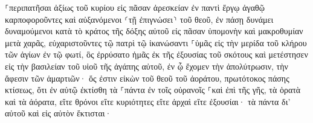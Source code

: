 \documentclass{openreader}
\begin{document}
⸀περιπατῆσαι ἀξίως τοῦ κυρίου εἰς πᾶσαν ἀρεσκείαν ἐν παντὶ ἔργῳ ἀγαθῷ καρποφοροῦντες καὶ αὐξανόμενοι ⸂τῇ ἐπιγνώσει⸃ τοῦ θεοῦ, 
ἐν πάσῃ δυνάμει δυναμούμενοι κατὰ τὸ κράτος τῆς δόξης αὐτοῦ εἰς πᾶσαν ὑπομονὴν καὶ μακροθυμίαν μετὰ χαρᾶς, 
εὐχαριστοῦντες τῷ πατρὶ τῷ ἱκανώσαντι ⸀ὑμᾶς εἰς τὴν μερίδα τοῦ κλήρου τῶν ἁγίων ἐν τῷ φωτί, 
ὃς ἐρρύσατο ἡμᾶς ἐκ τῆς ἐξουσίας τοῦ σκότους καὶ μετέστησεν εἰς τὴν βασιλείαν τοῦ υἱοῦ τῆς ἀγάπης αὐτοῦ, 
ἐν ᾧ ἔχομεν τὴν ἀπολύτρωσιν, τὴν ἄφεσιν τῶν ἁμαρτιῶν· 
ὅς ἐστιν εἰκὼν τοῦ θεοῦ τοῦ ἀοράτου, πρωτότοκος πάσης κτίσεως, 
ὅτι ἐν αὐτῷ ἐκτίσθη τὰ ⸀πάντα ἐν τοῖς οὐρανοῖς ⸀καὶ ἐπὶ τῆς γῆς, τὰ ὁρατὰ καὶ τὰ ἀόρατα, εἴτε θρόνοι εἴτε κυριότητες εἴτε ἀρχαὶ εἴτε ἐξουσίαι· τὰ πάντα δι’ αὐτοῦ καὶ εἰς αὐτὸν ἔκτισται· 
\end{document}
